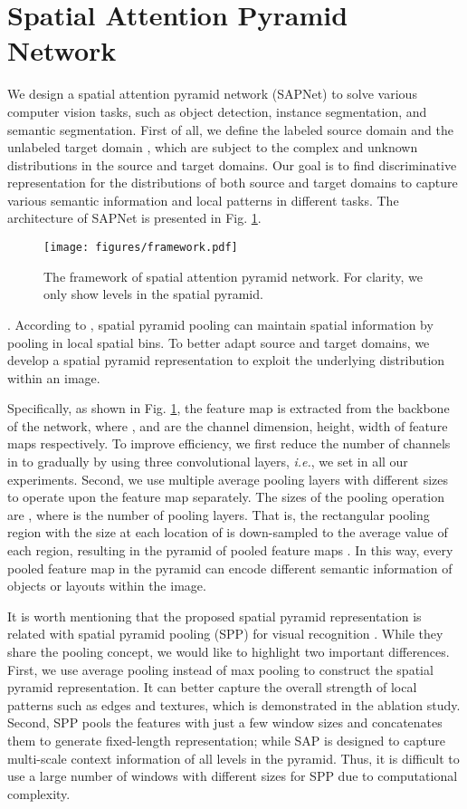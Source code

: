\documentclass[runningheads]{llncs}
\def\ie{{\em i.e.}}
\begin{document}
\section{Spatial Attention Pyramid Network}
\label{sec:method}
We design a spatial attention pyramid network (SAPNet) to solve various computer vision tasks, such as object detection, instance segmentation, and semantic segmentation. First of all, we define the labeled source domain  and the unlabeled target domain , which are subject to the complex and unknown distributions in the source and target domains. Our goal is to find discriminative representation for the distributions of both source and target domains to capture various semantic information and local patterns in different tasks. The architecture of SAPNet is presented in Fig. \ref{fig:framework}.
\begin{figure}[t]
\centering
\texttt{[image: figures/framework.pdf]}
\caption{The framework of spatial attention pyramid network. For clarity, we only show  levels in the spatial pyramid.}
\label{fig:framework}
\end{figure}

{.}
According to \cite{DBLP:journals/pami/HeZR015,DBLP:conf/cvpr/LazebnikSP06}, spatial pyramid pooling can maintain spatial information by pooling in local spatial bins. To better adapt source and target domains, we develop a spatial pyramid representation to exploit the underlying distribution within an image.

Specifically, as shown in Fig. \ref{fig:framework}, the feature map  is extracted from the backbone  of the network, where ,  and  are the channel dimension, height, width of feature maps respectively. To improve efficiency, we first reduce the number of channels in  to  gradually by using three  convolutional layers, \ie, we set  in all our experiments. Second, we use multiple average pooling layers with different sizes to operate upon the feature map  separately. The sizes of the pooling operation are , where  is the number of pooling layers. That is, the rectangular pooling region with the size  at each location of  is down-sampled to the average value of each region, resulting in the pyramid of  pooled feature maps . In this way, every pooled feature map  in the pyramid can encode different semantic information of objects or layouts within the image.

It is worth mentioning that the proposed spatial pyramid representation is related with spatial pyramid pooling (SPP) for visual recognition \cite{DBLP:journals/pami/HeZR015}. While they share the pooling concept, we would like to highlight two important differences. First, we use average pooling instead of max pooling to construct the spatial pyramid representation. It can better capture the overall strength of local patterns such as edges and textures, which is demonstrated in the ablation study. Second, SPP pools the features with just a few window sizes and concatenates them to generate fixed-length representation; while SAP is designed to capture multi-scale context information of all levels in the pyramid. Thus, it is difficult to use a large number of windows with different sizes for SPP due to computational complexity.
\end{document}
